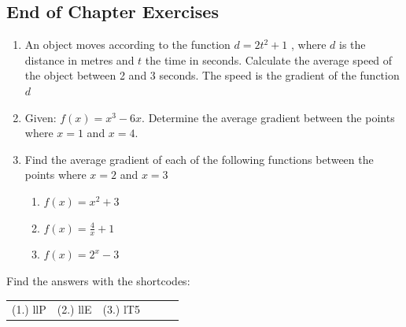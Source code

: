             \subsection{ End of Chapter Exercises}
            \nopagebreak
            \label{m39240*id191703}\begin{enumerate}[noitemsep, label=\textbf{\arabic*}. ] 
            \label{m39240*uid9}\item An object moves according to the function $d=2{t}^{2}+1$ , where $d$ is the distance in metres and $t$ the time in seconds. Calculate the average speed of the object between 2 and 3 seconds. The speed is the gradient of the function $d$\newline
\label{m39240*uid10}\item Given: $f\left(x\right)={x}^{3}-6x$.
Determine the average gradient between the points where $x=1$ and $x=4$.\newline
\label{m39240*uid111}\item Find the average gradient of each of the following functions between the points where $x=2$ and $x=3$
\label{m39240*id62342}\begin{enumerate}[noitemsep, label=\textbf{\alph*}. ] 
            \item $f\left(x\right)={x}^{2}+3$\item $f\left(x\right)=\frac{4}{x}+1$\item $f\left(x\right)={2}^{x}-3$\end{enumerate}
\end{enumerate}
  \label{m39240**end}
  \label{3b3f311aa3ebba82678f2a2244617492**end}
\par {} Find the answers with the shortcodes:
 \par \begin{tabular}[h]{cccccc}
 (1.) llP  &  (2.) llE  &  (3.) lT5  & \end{tabular}

